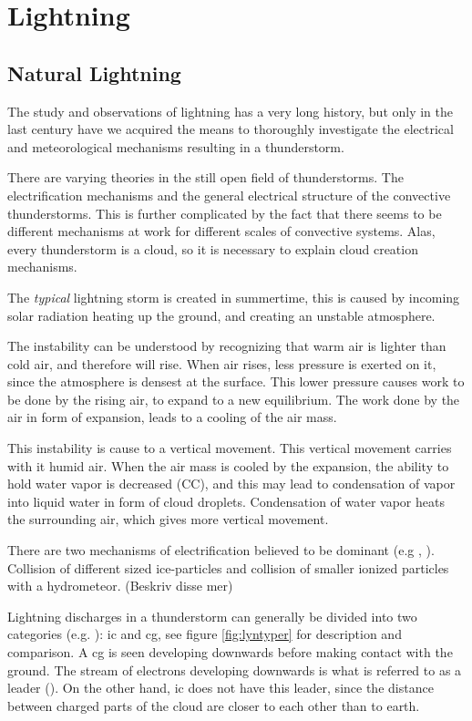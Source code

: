\setcounter{chapter}{1} 

\chapter{Lightning}

\section{Natural Lightning}
The study and observations of lightning has a very long history, but only in the last century have we acquired the means to thoroughly investigate the electrical and meteorological mechanisms resulting in a thunderstorm.

There are varying theories in  the still open field of thunderstorms. The electrification mechanisms and the general electrical structure of the convective thunderstorms. This is further complicated by the fact that there seems to be different mechanisms at work for different scales of convective systems. Alas, every thunderstorm is a cloud, so it is necessary to explain cloud creation mechanisms.

The \textit{typical} lightning storm is created in summertime, this is caused by incoming solar radiation heating up the ground, and creating an unstable atmosphere.

The instability can be understood by recognizing that warm air is lighter than cold air, and therefore will rise. When air rises, less pressure is exerted on it, since the atmosphere is densest at the surface. This lower pressure causes work to be done by the rising air, to expand to a new equilibrium. The work done by the air in form of expansion, leads to a cooling of the air mass.

This instability is cause to a vertical movement. This vertical movement carries with it humid air. When the air mass is cooled by the expansion, the ability to hold water vapor is decreased (CC), and this may lead to condensation of vapor into liquid water in form of cloud droplets. Condensation of water vapor heats the surrounding air, which gives more vertical movement.

There are two mechanisms of electrification believed to be dominant (e.g \cite{saunders2007}, \cite{soula2012}). Collision of different sized ice-particles and collision of smaller ionized particles with a hydrometeor. (Beskriv disse mer)

Lightning discharges in a thunderstorm can generally be divided into two categories (e.g. \cite{lynn2011}): \acrfull{ic} and \acrfull{cg}, see figure \ref{fig:lyntyper} for description and comparison. A \acrshort{cg} is seen developing downwards before making contact with the ground. The stream of electrons developing downwards is what is referred to as a leader (\cite{rakovBok}). On the other hand, \acrshort{ic} does not have this leader, since the distance between charged parts of the cloud are closer to each other than to earth.

